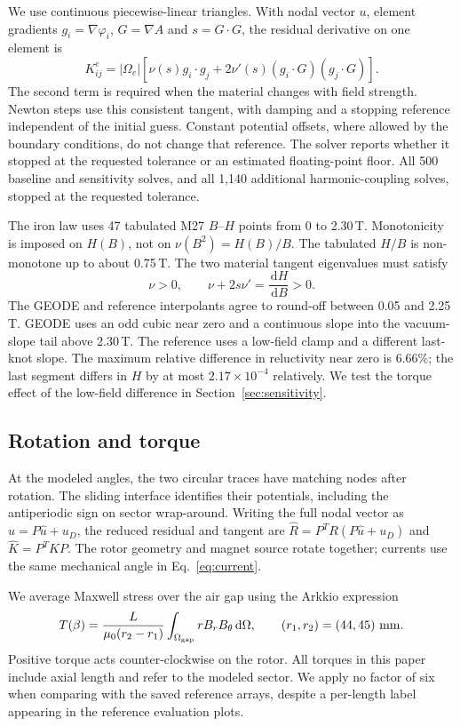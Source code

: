 \documentclass{anvil-paper}
\newcommand{\dd}{\,\mathrm{d}}
\begin{document}
We use continuous piecewise-linear triangles. With nodal vector $u$,
element gradients $g_i=\nabla\varphi_i$, $G=\nabla A$ and $s=G\cdot G$,
the residual derivative on one element is
\begin{equation}
 K^e_{ij}=|\Omega_e|\left[\nu(s)g_i\cdot g_j
       +2\nu'(s)(g_i\cdot G)(g_j\cdot G)\right].
 \label{eq:tangent}
\end{equation}
The second term is required when the material changes with field strength.
Newton steps use this consistent tangent, with damping and a stopping
reference independent of the initial guess. Constant potential offsets,
where allowed by the boundary conditions, do not change that reference.
The solver reports whether it stopped at the requested tolerance or an
estimated floating-point floor. All 500 baseline and sensitivity solves, and all 1,140
additional harmonic-coupling solves, stopped at the requested tolerance.

The iron law uses 47 tabulated M27 $B$--$H$ points from 0 to 2.30\,T.
Monotonicity is imposed on $H(B)$, not on $\nu(B^2)=H(B)/B$.
The tabulated $H/B$ is non-monotone up to about 0.75\,T.
The two material tangent eigenvalues must satisfy
\begin{equation}
 \nu>0,\qquad \nu+2s\nu'=\frac{\dd H}{\dd B}>0.
\end{equation}
The GEODE and reference interpolants agree to round-off between 0.05 and
2.25\,T. GEODE uses an odd cubic near zero and a continuous slope into the
vacuum-slope tail above 2.30\,T. The reference uses a low-field clamp and
a different last-knot slope. The maximum relative difference in
reluctivity near zero is 6.66\%; the last segment differs in $H$ by at
most $2.17\times10^{-4}$ relatively. We test the torque effect of the
low-field difference in Section~\ref{sec:sensitivity}.

\subsection{Rotation and torque}
At the modeled angles, the two circular traces have matching nodes after
rotation. The sliding interface identifies their potentials, including
the antiperiodic sign on sector wrap-around. Writing the full nodal vector
as $u=P\hat u+u_D$, the reduced residual and tangent are
$\hat R=P^T R(P\hat u+u_D)$ and $\hat K=P^T K P$.
The rotor geometry and magnet source rotate together; currents use the
same mechanical angle in Eq.~\eqref{eq:current}.

We average Maxwell stress over the air gap using the Arkkio expression
\citep{arkkio1987}
\begin{equation}
 T(\beta)=\frac{L}{\mu_0(r_2-r_1)}
  \int_{\Omega_{\rm gap}}r B_r B_\theta\dd\Omega,
 \qquad(r_1,r_2)=(44,45)\ {\rm mm}.
 \label{eq:torque}
\end{equation}
Positive torque acts counter-clockwise on the rotor. All torques in this
paper include axial length and refer to the modeled sector. We apply no
factor of six when comparing with the saved reference arrays, despite a
per-length label appearing in the reference evaluation plots.
\end{document}
